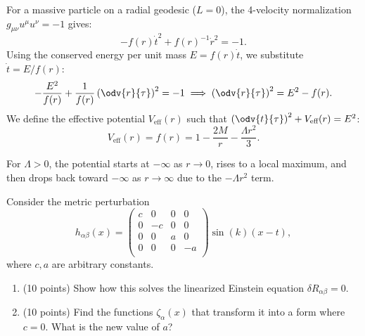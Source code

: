 \begin{solution}[(ii)]
  For a massive particle on a radial geodesic ($L=0$), the 4-velocity normalization $g_{\mu\nu}u^\mu u^\nu = -1$ gives:
  \[%
    -f(r) \dot{t}^2 + f(r)^{-1} \dot{r}^2 = -1
  .\]%
  Using the conserved energy per unit mass $E = f(r) \dot{t}$, we substitute $\dot{t} = E/f(r)$:
  \[%
    -\frac{E^2}{f(r)} + \frac{1}{f(r)} \left(\odv{r}{\tau}\right)^2 = -1 \implies \left(\odv{r}{\tau}\right)^2 = E^2 - f(r)
  .\]%
  We define the effective potential $V_{\text{eff}}(r)$ such that $\left(\odv{t}{\tau}\right)^2 + V_{\text{eff}}(r) = E^2$:
  \[%
    V_{\text{eff}}(r) = f(r) = 1 - \frac{2M}{r} - \frac{\Lambda r^2}{3}
  .\]%

  For $\Lambda > 0$, the potential starts at $-\infty$ as $r \to 0$, rises to a local maximum, and then drops back toward $-\infty$ as $r \to \infty$ due to the $-\Lambda r^2$ term.
\end{solution}

\begin{problem}
  Consider the metric perturbation
  \[%
    h_{\alpha\beta}(x) = \begin{pmatrix}
      c & 0 & 0 & 0 \\
      0 & -c & 0 & 0 \\
      0 & 0 & a & 0 \\
      0 & 0 & 0 & -a \\
    \end{pmatrix} \sin(k)(x - t)
  ,\]%
  where $c, a$ are arbitrary constants.
  \begin{enumerate}
    \item (10 points) Show how this solves the linearized Einstein equation $\delta R_{\alpha\beta} = 0$.
    \item (10 points) Find the functions $\zeta_\alpha(x)$ that transform it into a form where $c = 0$. What is the new value of $a$?
  \end{enumerate}
\end{problem}

